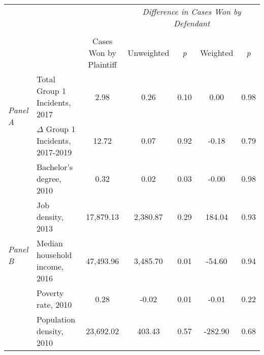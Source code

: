 \begin{tabular}{llccccc}
\toprule
 &  & \textit{} & \multicolumn{4}{c}{\textit{Difference in Cases Won by Defendant}} \\
\cline{4-7}
\\
 &  & Cases Won by Plaintiff & Unweighted & \emph{p} & Weighted & \emph{p} \\
\midrule
\multirow[c]{2}{.75cm}{\textit{Panel A}} & Total Group 1 Incidents, 2017 & 2.98 & 0.26 & 0.10 & 0.00 & 0.98 \\
 & $\Delta$ Group 1 Incidents, 2017-2019 & 12.72 & 0.07 & 0.92 & -0.18 & 0.79 \\
\cline{1-7}
\multirow[c]{5}{.75cm}{\textit{Panel B}} & Bachelor's degree, 2010 & 0.32 & 0.02 & 0.03 & -0.00 & 0.98 \\
 & Job density, 2013 & 17,879.13 & 2,380.87 & 0.29 & 184.04 & 0.93 \\
 & Median household income, 2016 & 47,493.96 & 3,485.70 & 0.01 & -54.60 & 0.94 \\
 & Poverty rate, 2010 & 0.28 & -0.02 & 0.01 & -0.01 & 0.22 \\
 & Population density, 2010 & 23,692.02 & 403.43 & 0.57 & -282.90 & 0.68 \\
\cline{1-7}
\bottomrule
\end{tabular}
